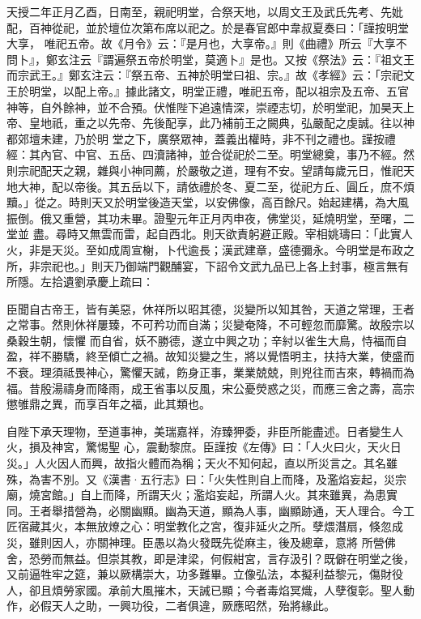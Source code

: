 \begin{pinyinscope}
 天授二年正月乙酉，日南至，親祀明堂，合祭天地，以周文王及武氏先考、先妣配，百神從祀，並於壇位次第布席以祀之。於是春官郎中韋叔夏奏曰：「謹按明堂大享，
 唯祀五帝。故《月令》云：『是月也，大享帝。』則《曲禮》所云『大享不問卜』，鄭玄注云『謂遍祭五帝於明堂，莫適卜』是也。又按《祭法》云：『祖文王而宗武王。』鄭玄注云：『祭五帝、五神於明堂曰祖、宗。』故《孝經》云：「宗祀文王於明堂，以配上帝。』據此諸文，明堂正禮，唯祀五帝，配以祖宗及五帝、五官神等，自外餘神，並不合預。伏惟陛下追遠情深，崇禋志切，於明堂祀，加昊天上帝、皇地祇，重之以先帝、先後配享，此乃補前王之闕典，弘嚴配之虔誠。往以神都郊壇未建，乃於明
 堂之下，廣祭眾神，蓋義出權時，非不刊之禮也。謹按禮經：其內官、中官、五岳、四瀆諸神，並合從祀於二至。明堂總奠，事乃不經。然則宗祀配天之親，雜與小神同薦，於嚴敬之道，理有不安。望請每歲元日，惟祀天地大神，配以帝後。其五岳以下，請依禮於冬、夏二至，從祀方丘、圓丘，庶不煩黷。」從之。時則天又於明堂後造天堂，以安佛像，高百餘尺。始起建構，為大風振倒。俄又重營，其功未畢。證聖元年正月丙申夜，佛堂災，延燒明堂，至曙，二堂並
 盡。尋時又無雲而雷，起自西北。則天欲責躬避正殿。宰相姚璹曰：「此實人火，非是天災。至如成周宣榭，卜代逾長；漢武建章，盛德彌永。今明堂是布政之所，非宗祀也。」則天乃御端門觀酺宴，下詔令文武九品已上各上封事，極言無有所隱。左拾遺劉承慶上疏曰：



 臣聞自古帝王，皆有美惡，休祥所以昭其德，災變所以知其咎，天道之常理，王者之常事。然則休祥屢臻，不可矜功而自滿；災變奄降，不可輕忽而靡驚。故殷宗以桑穀生朝，懷懼
 而自省，妖不勝德，遂立中興之功；辛紂以雀生大鳥，恃福而自盈，祥不勝驕，終至傾亡之禍。故知災變之生，將以覺悟明主，扶持大業，使盛而不衰。理須祗畏神心，驚懼天誡，飭身正事，業業兢兢，則兇往而吉來，轉禍而為福。昔殷湯禱身而降雨，成王省事以反風，宋公憂熒惑之災，而應三舍之壽，高宗懲雊鼎之異，而享百年之福，此其類也。



 自陛下承天理物，至道事神，美瑞嘉祥，洊臻狎委，非臣所能盡述。日者變生人火，損及神宮，驚惕聖
 心，震動黎庶。臣謹按《左傳》曰：「人火曰火，天火日災。」人火因人而興，故指火體而為稱；天火不知何起，直以所災言之。其名雖殊，為害不別。又《漢書·五行志》曰：「火失性則自上而降，及濫焰妄起，災宗廟，燒宮館。」自上而降，所謂天火；濫焰妄起，所謂人火。其來雖異，為患實同。王者舉措營為，必關幽顯。幽為天道，顯為人事，幽顯跡通，天人理合。今工匠宿藏其火，本無放燎之心：明堂教化之宮，復非延火之所。孽煨潛扇，倏忽成災，雖則因人，亦關神理。臣愚以為火發既先從麻主，後及總章，意將
 所營佛舍，恐勞而無益。但崇其教，即是津梁，何假紺宮，言存汲引？既僻在明堂之後，又前逼牲牢之筵，兼以厥構崇大，功多難畢。立像弘法，本擬利益黎元，傷財役人，卻且煩勞家國。承前大風摧木，天誡已顯；今者毒焰冥熾，人孽復彰。聖人動作，必假天人之助，一興功役，二者俱違，厥應昭然，殆將緣此。




\end{pinyinscope}
